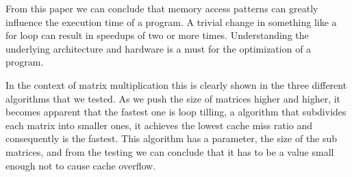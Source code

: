 \documentclass[a4paper]{article}
\begin{document}
From this paper we can conclude that memory access patterns can greatly influence the execution time of a program. A trivial change in something like a for loop can result in speedups of two or more times. Understanding the underlying architecture and hardware is a must for the optimization of a program. \par

In the context of matrix multiplication this is clearly shown in the three different algorithms that we tested. As we push the size of matrices higher and higher, it becomes apparent that the fastest one is loop tilling, a algorithm that subdivides each matrix into smaller ones, it achieves the lowest cache miss ratio and consequently is the fastest. This algorithm has a parameter, the size of the sub matrices, and from the testing we can conclude that it has to be a value small enough not to cause cache overflow.
\end{document}
